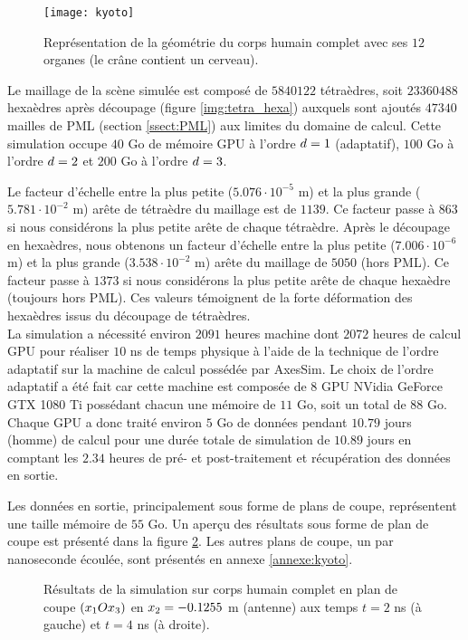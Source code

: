 \begin{figure}[!h]
	\centering
	\caption{
		\label{img:kyoto}
		Représentation de la géométrie du corps humain complet
		avec ses $12$ organes (le crâne contient un cerveau).
	}
	\texttt{[image: kyoto]}
\end{figure}


Le maillage de la scène simulée est composé de
$5840122$ tétraèdres, soit $23360488$ hexaèdres après
découpage (figure \ref{img:tetra_hexa}) auxquels sont ajoutés
$47340$ mailles de PML (section \ref{ssect:PML}) aux limites du
domaine de calcul.
Cette simulation occupe $40$ Go de
mémoire GPU à l’ordre $d = 1$ (adaptatif), $100$ Go à l’ordre $d = 2$ et
$200$ Go à l’ordre $d = 3$.

Le facteur d'échelle entre la plus petite ($5.076 \cdot 10^{-5}$ m)
et la plus grande ($5.781 \cdot 10^{-2}$ m) arête
de tétraèdre du maillage est de $1139$. Ce facteur passe à $863$
si nous considérons la plus petite arête de chaque tétraèdre.
Après le découpage en hexaèdres, nous obtenons un facteur
d'échelle entre la plus petite ($7.006 \cdot 10^{-6}$ m)
et la plus grande ($3.538 \cdot 10^{-2}$ m) arête
du maillage de $5050$ (hors PML).
Ce facteur passe à $1373$
si nous considérons la plus petite arête de chaque hexaèdre (toujours hors PML).
Ces valeurs témoignent de la forte déformation des hexaèdres
issus du découpage de tétraèdres.
\\


La simulation a nécessité environ
$2091$ heures machine dont $2072$ heures de calcul GPU
pour réaliser $10$ ns de temps physique
à l’aide de la technique de l’ordre adaptatif sur 
la machine de calcul possédée par AxesSim.
Le choix de l'ordre adaptatif a été fait car
cette machine est composée de $8$ GPU NVidia GeForce GTX 1080 Ti
possédant chacun une mémoire de $11$ Go, soit un total de $88$ Go.
Chaque GPU a donc traité environ $5$ Go de données
pendant $10.79$ jours (homme) de calcul pour
une durée totale de simulation de $10.89$ jours en comptant
les $2.34$ heures de pré- et post-traitement et récupération des
données en sortie.


Les données en sortie, principalement sous forme de plans de coupe,
représentent une taille mémoire de $55$ Go.
Un aperçu des résultats sous forme de plan de coupe
est présenté dans la figure \ref{img:kyoto_cutplane}.
Les autres plans de coupe, un par nanoseconde écoulée,
sont présentés en annexe \ref{annexe:kyoto}.

\begin{figure}[!h]
	\centering
	\caption{
		\label{img:kyoto_cutplane}
		Résultats de la simulation sur corps humain complet
		en plan de coupe $(x_1 O x_3)$
		en $x_2 = -0.1255$ m (antenne)
		aux temps $t=2$ ns (à gauche) et $t=4$ ns (à droite).
	}
	\hfill
\end{figure}

